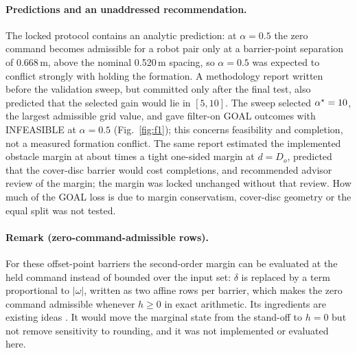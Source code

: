 \documentclass[11pt]{article}
\begin{document}
\paragraph{Predictions and an unaddressed recommendation.} The locked protocol contains an analytic
prediction: at $\alpha=0.5$ the zero command becomes admissible for a robot pair only at a barrier-point
separation of 0.668\,m, above the nominal 0.520\,m spacing, so $\alpha=0.5$ was expected to conflict
strongly with holding the formation. A methodology report written before the validation sweep, but
committed only after the final test, also predicted that the
selected gain would lie in $[5,10]$. The sweep selected $\alpha^\star=10$, the largest admissible
grid value, and gave \SelGoalhalf{} filter-on GOAL outcomes with \SelInfhalf{} INFEASIBLE at
$\alpha=0.5$ (Fig.~\ref{fig:f1}); this concerns feasibility and completion, not a measured formation
conflict. The same report estimated the implemented obstacle margin at about \MarginRatioObst{} times a
tight one-sided margin at $d=D_o$, predicted that the cover-disc barrier would cost completions, and
recommended advisor review of the margin; the margin was locked unchanged without that review. How much
of the GOAL loss is due to margin conservatism, cover-disc geometry or the equal split was not tested.

\paragraph{Remark (zero-command-admissible rows).} For these offset-point barriers the second-order
margin can be evaluated at the held command instead of bounded over the input set: $\delta$ is replaced
by a term proportional to $|\omega|$, written as two affine rows per barrier, which makes the zero
command admissible whenever $h\ge0$ in exact arithmetic. Its ingredients
are existing ideas \cite{breeden2022,vandenberg2011,chen2021}. It would move the marginal state from the
stand-off to $h=0$ but not remove sensitivity to rounding, and it was not implemented or evaluated here.
\end{document}
